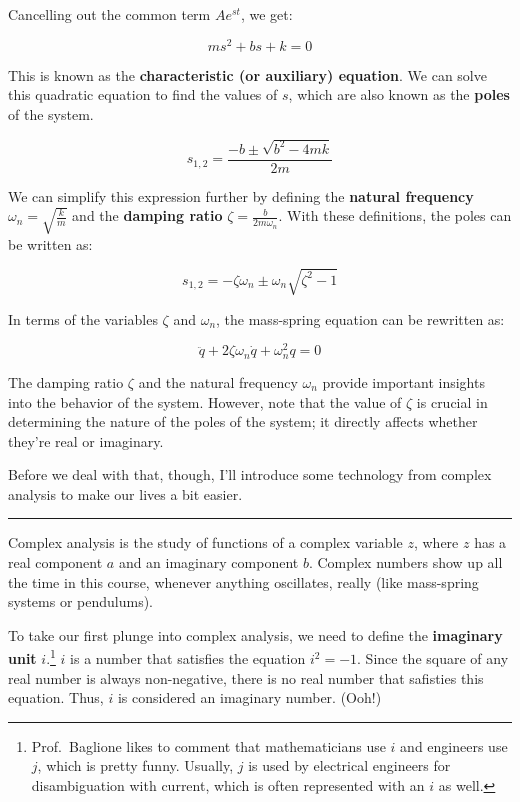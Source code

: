 \documentclass[
  letterpaper,
  DIV=11,
  numbers=noendperiod]{scrreprt}
\begin{document}
Cancelling out the common term \(Ae^{st}\), we get:

\[ms^2 + bs + k = 0\]

This is known as the \textbf{characteristic (or auxiliary) equation}. We
can solve this quadratic equation to find the values of \(s\), which are
also known as the \textbf{poles} of the system.

\[s_{1, 2} = \frac{-b \pm \sqrt{b^2 - 4mk}}{2m}\]

We can simplify this expression further by defining the \textbf{natural
frequency} \(\omega_n = \sqrt{\frac{k}{m}}\) and the \textbf{damping
ratio} \(\zeta = \frac{b}{2m\omega_n}\). With these definitions, the
poles can be written as:

\[s_{1, 2} = -\zeta \omega_n \pm \omega_n \sqrt{\zeta^2 - 1}\]

In terms of the variables \(\zeta\) and \(\omega_n\), the mass-spring
equation can be rewritten as:

\[\ddot{q} + 2\zeta\omega_n \dot{q} + \omega_n^2 q = 0\]

The damping ratio \(\zeta\) and the natural frequency \(\omega_n\)
provide important insights into the behavior of the system. However,
note that the value of \(\zeta\) is crucial in determining the nature of
the poles of the system; it directly affects whether they're real or
imaginary.

Before we deal with that, though, I'll introduce some technology from
complex analysis to make our lives a bit easier.

\begin{center}\rule{0.5\linewidth}{0.5pt}\end{center}

Complex analysis is the study of functions of a complex variable \(z\),
where \(z\) has a real component \(a\) and an imaginary component \(b\).
Complex numbers show up all the time in this course, whenever anything
oscillates, really (like mass-spring systems or pendulums).

To take our first plunge into complex analysis, we need to define the
\textbf{imaginary unit} \(i\).\footnote{Prof.~Baglione likes to comment
  that mathematicians use \(i\) and engineers use \(j\), which is pretty
  funny. Usually, \(j\) is used by electrical engineers for
  disambiguation with current, which is often represented with an \(i\)
  as well.} \(i\) is a number that satisfies the equation \(i^2 = -1\).
Since the square of any real number is always non-negative, there is no
real number that safisties this equation. Thus, \(i\) is considered an
imaginary number. (Ooh!)
\end{document}
